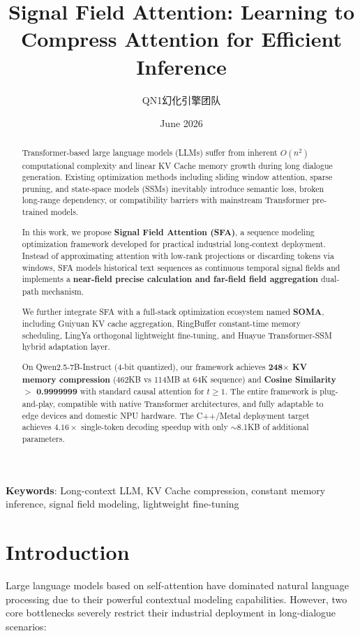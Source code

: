 \documentclass{article}
\title{Signal Field Attention: Learning to Compress Attention for Efficient Inference}
\author{QN1幻化引擎团队}
\date{June 2026}
\begin{document}
\maketitle

\begin{abstract}
Transformer-based large language models (LLMs) suffer from inherent $O(n^2)$ computational complexity and linear KV Cache memory growth during long dialogue generation. Existing optimization methods including sliding window attention, sparse pruning, and state-space models (SSMs) inevitably introduce semantic loss, broken long-range dependency, or compatibility barriers with mainstream Transformer pre-trained models.

In this work, we propose \textbf{Signal Field Attention (SFA)}, a sequence modeling optimization framework developed for practical industrial long-context deployment. Instead of approximating attention with low-rank projections or discarding tokens via windows, SFA models historical text sequences as continuous temporal signal fields and implements a \textbf{near-field precise calculation and far-field field aggregation} dual-path mechanism.

We further integrate SFA with a full-stack optimization ecosystem named \textbf{SOMA}, including Guiyuan KV cache aggregation, RingBuffer constant-time memory scheduling, LingYa orthogonal lightweight fine-tuning, and Huayue Transformer-SSM hybrid adaptation layer.

On Qwen2.5-7B-Instruct (4-bit quantized), our framework achieves \textbf{248$\times$ KV memory compression} (462KB vs 114MB at 64K sequence) and \textbf{Cosine Similarity $>$ 0.9999999} with standard causal attention for $t \geq 1$. The entire framework is plug-and-play, compatible with native Transformer architectures, and fully adaptable to edge devices and domestic NPU hardware. The C++/Metal deployment target achieves $4.16\times$ single-token decoding speedup with only $\sim$8.1KB of additional parameters.
\end{abstract}

\textbf{Keywords}: Long-context LLM, KV Cache compression, constant memory inference, signal field modeling, lightweight fine-tuning

\section{Introduction}
Large language models based on self-attention have dominated natural language processing due to their powerful contextual modeling capabilities. However, two core bottlenecks severely restrict their industrial deployment in long-dialogue scenarios:
\end{document}
